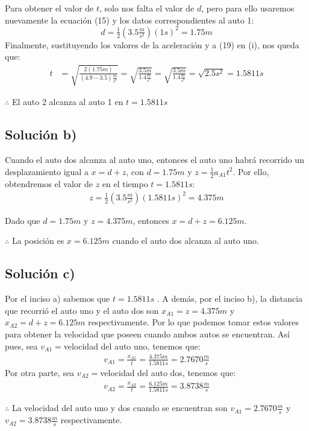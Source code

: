 \documentclass[letterpaper,12pt]{article}
\begin{document}
\begin{enumerate}
Para obtener el valor de $t$, solo nos falta el valor de $d$, pero para ello usaremos nuevamente la ecuación (15) y los datos correspondientes al auto 1:
\begin{equation}
    d=  \tfrac{1}{2}(3.5\tfrac{m}{s^2}) (1s)^2 = 1.75 m
\end{equation}
Finalmente, sustituyendo los valores de la aceleración y a (19) en (i), nos queda que:
\begin{align*}
     t   &= \sqrt{\tfrac{2(1.75 m)}{(4.9-3.5) \tfrac{m}{s^2}} } =\sqrt{\tfrac{3.5m}{1.4\tfrac{m}{s^2}} } = \sqrt{\tfrac{3.5m}{1.4\tfrac{m}{s^2}} } = \sqrt{2.5 s^2} = 1.5811 s
\end{align*}
    \begin{center}
        $\therefore$ El auto 2 alcanza al auto 1 en $t=1.5811 s$
    \end{center}


\subsection*{Solución b)}
Cuando el auto dos alcanza al auto uno, entonces el auto uno habrá recorrido un desplazamiento igual a $x= d+z$, con $d=1.75m$ y $z=\tfrac{1}{2}a_{A1} t^2$. Por ello, obtendremos el valor de $z$ en el tiempo $t=1.5811 s$:
\begin{align*}
    z=\tfrac{1}{2}(3.5 \tfrac{m}{s^2}) (1.5811 s)^2 = 4.375 m 
\end{align*}

Dado que $d=1.75m$ y $z=4.375 m$, entonces $x= d+z= 6.125 m$.
    \begin{center}
        $\therefore$ La posición es $x= 6.125 m$ cuando el auto dos alcanza al auto uno.
    \end{center}

\subsection*{Solución c)}
Por el inciso a) sabemos que $t= 1.5811 s$ . A demás, por el inciso b), la distancia que recorrió el auto uno y el auto dos son $x_{A1}= z=4.375 m$ y $x_{A2}= d+z= 6.125 m$ respectivamente. Por lo que podemos tomar estos valores para obtener la velocidad que poseen cuando ambos autos se encuentran. Así pues, sea $v_{A1}=$velocidad del auto uno, tenemos que:
\begin{align*}
    v_{A1}= \frac{x_{A1}}{t}= \frac{4.375 m}{1.5811 s} = 2.7670\tfrac{m}{s}
\end{align*}
Por otra parte, sea $v_{A2}=$velocidad del auto dos, tenemos que:
\begin{align*}
    v_{A2}= \frac{x_{A2}}{t}= \frac{6.125 m}{1.5811 s} = 3.8738\tfrac{m}{s}
\end{align*}
    \begin{center}
        $\therefore$ La velocidad del auto uno y dos cuando se encuentran son $v_{A1}= 2.7670\tfrac{m}{s}$ y $v_{A2}= 3.8738\tfrac{m}{s}$ respectivamente. 
    \end{center}



\end{enumerate}
\end{document}
